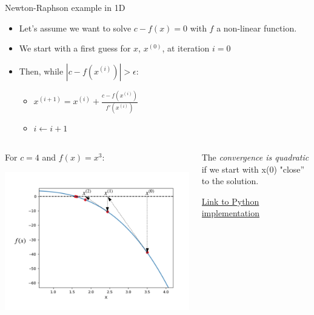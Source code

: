 \begin{frame}[allowframebreaks]{Newton-Raphson example in 1D}
    \begin{itemize}
        \item Let's assume we want to solve $c-f(x) = 0$ with $f$ a non-linear function.
        \item We start with a first guess for $x$, $x^{(0)}$, at iteration $i=0$
        \item Then, while $|c-f(x^{(i)})| > \epsilon$:
        \begin{itemize}
            \item $x^{(i+1)} = x^{(i)} + \frac{c-f(x^{(i)})}{f'(x^{(i)})}$
            \item $i \leftarrow i + 1$
        \end{itemize}
    \end{itemize}
    
    \begin{columns}
    \begin{column}{0.55\textwidth}
    For $c=4$ and $f(x) = x^3$:
    \begin{center}
        \includegraphics[width=\linewidth]{images/NR-1D.png}
    \end{center}
    \end{column}
    \begin{column}{0.45\textwidth}
    The \textit{convergence is quadratic} if we start with x(0) "close” to the solution.

    \href{https://colab.research.google.com/drive/12tCcO6kPxkoScAGnUYxgumS3CVSBSmtJ?usp=sharing}{\underline{Link to Python implementation}} 
    \end{column}
    \end{columns}
    
\end{frame}

